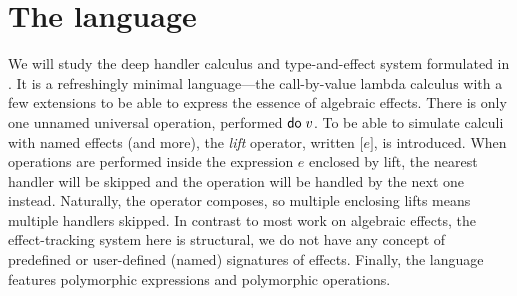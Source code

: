 \documentclass[a4paper, 12pt]{report}
\newcommand{\Do}{\textsf{do\;}}
\newcommand{\Lift}[1]{\boldsymbol{[}#1\boldsymbol{]}}
\newcommand{\+}{\enspace}
\begin{document}
\iffalse
This work will study a particular formal language equipped with algebraic effects.
Although most results in the domain of programming languages depend crucially on the exact calculus and type system used,
we hope that the results, ideas, and techniques may apply elsewhere.
This should not seem far-fetched,
as the paper which introduced the language \cite{fscd19} is exactly about
interexpressibility with other systems.

Possibly the most interesting result of this work is a potentially novel use of coinduction
in the method of logical relations.
It allowed us to get rid of step-indexing in the definition of the logical relation and
ultimately prove termination of the language.
This may sound surprising, as coinduction is connotated primarily with infinite processes.

[todo other contributions]

I would like to thank Dariusz Biernacki, Filip Sieczkowski, and Piotr Polesiuk
for their help with this work.

\fi

\chapter{The language}

We will study the deep handler calculus and type-and-effect system formulated
in \cite{fscd19}.
It is a refreshingly minimal language---the call-by-value lambda calculus with a few extensions
to be able to express the essence of algebraic effects.
There is only one unnamed universal operation, performed $\Do v$.
To be able to simulate calculi with named effects (and more),
the \textit{lift} operator, written $\Lift{e}$, is introduced.
When operations are performed inside the expression $e$ enclosed by lift,
the nearest handler will be skipped and the operation will be handled by the next one instead.
Naturally, the operator composes, so multiple enclosing lifts means multiple handlers skipped.
In contrast to most work on algebraic effects, the effect-tracking system here is structural,
we do not have any concept of predefined or user-defined (named) signatures of effects.
Finally, the language features polymorphic expressions and polymorphic operations.
\end{document}
